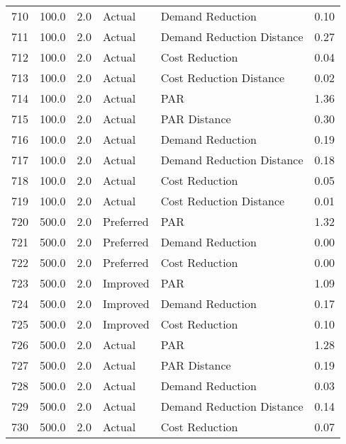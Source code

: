 \begin{longtable}{lrrllr}
710  &        100.0 &     2.0 &         Actual &           Demand Reduction &   0.10 \\
711  &        100.0 &     2.0 &         Actual &  Demand Reduction Distance &   0.27 \\
712  &        100.0 &     2.0 &         Actual &             Cost Reduction &   0.04 \\
713  &        100.0 &     2.0 &         Actual &    Cost Reduction Distance &   0.02 \\
714  &        100.0 &     2.0 &         Actual &                        PAR &   1.36 \\
715  &        100.0 &     2.0 &         Actual &               PAR Distance &   0.30 \\
716  &        100.0 &     2.0 &         Actual &           Demand Reduction &   0.19 \\
717  &        100.0 &     2.0 &         Actual &  Demand Reduction Distance &   0.18 \\
718  &        100.0 &     2.0 &         Actual &             Cost Reduction &   0.05 \\
719  &        100.0 &     2.0 &         Actual &    Cost Reduction Distance &   0.01 \\
720  &        500.0 &     2.0 &      Preferred &                        PAR &   1.32 \\
721  &        500.0 &     2.0 &      Preferred &           Demand Reduction &   0.00 \\
722  &        500.0 &     2.0 &      Preferred &             Cost Reduction &   0.00 \\
723  &        500.0 &     2.0 &       Improved &                        PAR &   1.09 \\
724  &        500.0 &     2.0 &       Improved &           Demand Reduction &   0.17 \\
725  &        500.0 &     2.0 &       Improved &             Cost Reduction &   0.10 \\
726  &        500.0 &     2.0 &         Actual &                        PAR &   1.28 \\
727  &        500.0 &     2.0 &         Actual &               PAR Distance &   0.19 \\
728  &        500.0 &     2.0 &         Actual &           Demand Reduction &   0.03 \\
729  &        500.0 &     2.0 &         Actual &  Demand Reduction Distance &   0.14 \\
730  &        500.0 &     2.0 &         Actual &             Cost Reduction &   0.07 \\

\end{longtable}
